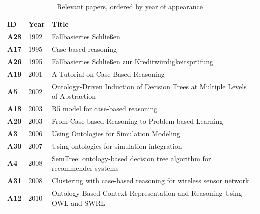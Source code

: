             
        	    {
        	    \begin{longtable}{ | m{1cm} | m{1.5cm} | m{12cm} | }
                    \caption{\label{tab:rel-papers} Relevant papers, ordered by year of appearance}\\
                    \hline
                    \textbf{ID} &\textbf{Year} &\textbf{Title} \\
                    \hline
                    \endfirsthead
                    
                    \hline
                    \textbf{A28} &1992 &Fallbasiertes Schließen \cite{althoff1992fallbasiertes} \\
                    \hline
                    \textbf{A17} &1995 &Case based reasoning \cite{richter2016case} \\
                    \hline
                    \textbf{A26} &1995 &Fallbasiertes Schließen zur Kreditwürdigkeitsprüfung \cite{wilke1995fallbasiertes} \\
                    \hline
                    \textbf{A19} &2001 &A Tutorial on Case Based Reasoning \cite{main2001tutorial} \\
                    \hline
                    \textbf{A5} &2002 &Ontology-Driven Induction of Decision Trees at Multiple Levels of Abstraction \cite{zhang2002ontology} \\
                    \hline
                    \textbf{A18} &2003 &R5 model for case-based reasoning \cite{finnie2003r5} \\
                    \hline
                    \textbf{A20} &2003 &From Case-based Reasoning to Problem-based Learning \cite{eshach2003case} \\
                    \hline
                    \textbf{A3} &2006 &Using Ontologies for Simulation Modeling \cite{benjamin2006using}\\
                    \hline
                    \textbf{A30} &2007 &Using ontologies for simulation integration \cite{benjamin2007using}\\
                    \hline
                    \textbf{A4} &2008 &SemTree: ontology-based decision tree algorithm for recommender systems \cite{bouza2008semtree} \\
                    \hline
                    \textbf{A31} &2008 &Clustering with case-based reasoning for wireless sensor network \cite{wang2008clustering} \\
                    \hline
                    \textbf{A12} &2010 &Ontology-Based Context Representation and Reasoning Using OWL and SWRL \cite{liu2010ontology} \\

\end{longtable}}

